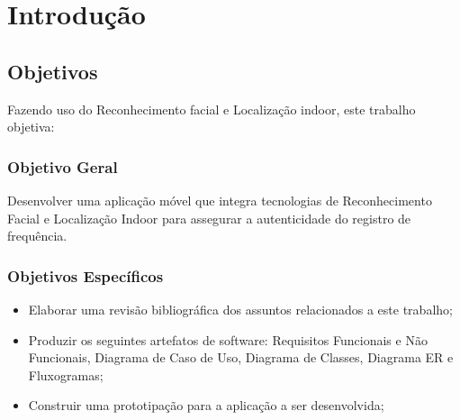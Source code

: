 
\chapter{Introdução}\label{ch:intro}


\section{Objetivos}\label{sec:objetivos}
Fazendo uso do Reconhecimento facial e Localização indoor, este trabalho objetiva:

\subsection{Objetivo Geral}\label{subsec:objetivo-geral}
Desenvolver uma aplicação móvel que integra tecnologias de Reconhecimento Facial e Localização Indoor para assegurar a autenticidade do registro de frequência.

\subsection{Objetivos Específicos}\label{subsec:objetivos-especificos}
\begin{itemize}

    \item Elaborar uma revisão bibliográfica dos assuntos relacionados a este trabalho;
    \item Produzir os seguintes artefatos de software: Requisitos Funcionais e Não Funcionais, Diagrama de Caso de Uso, Diagrama de Classes, Diagrama ER e Fluxogramas;
    \item Construir uma prototipação para a aplicação a ser desenvolvida;

\end{itemize}
